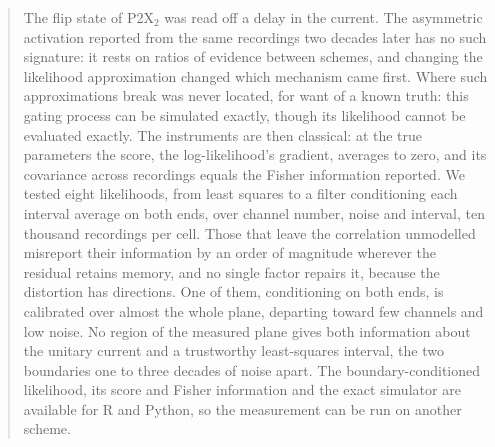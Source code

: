 \begin{abstract}
The flip state of P2X$_2$ was read off a delay in the current. The asymmetric activation reported from the same recordings two decades later has no such signature: it rests on ratios of evidence between schemes, and changing the likelihood approximation changed which mechanism came first. Where such approximations break was never located, for want of a known truth: this gating process can be simulated exactly, though its likelihood cannot be evaluated exactly. The instruments are then classical: at the true parameters the score, the log-likelihood's gradient, averages to zero, and its covariance across recordings equals the Fisher information reported. We tested eight likelihoods, from least squares to a filter conditioning each interval average on both ends, over channel number, noise and interval, ten thousand recordings per cell. Those that leave the correlation unmodelled misreport their information by an order of magnitude wherever the residual retains memory, and no single factor repairs it, because the distortion has directions. One of them, conditioning on both ends, is calibrated over almost the whole plane, departing toward few channels and low noise. No region of the measured plane gives both information about the unitary current and a trustworthy least-squares interval, the two boundaries one to three decades of noise apart. The boundary-conditioned likelihood, its score and Fisher information and the exact simulator are available for R and Python, so the measurement can be run on another scheme.
\end{abstract}
